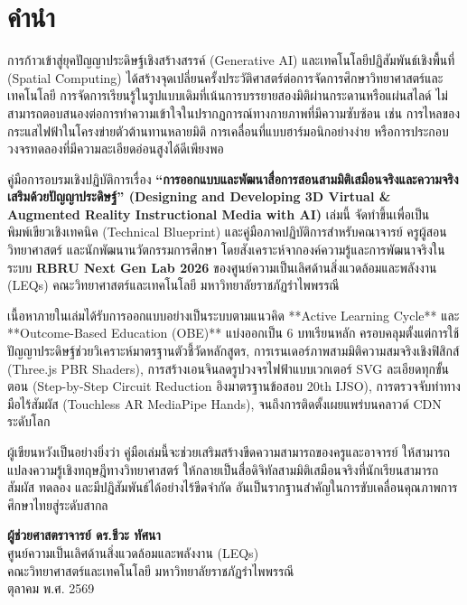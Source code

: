 \chapter*{คำนำ}

การก้าวเข้าสู่ยุคปัญญาประดิษฐ์เชิงสร้างสรรค์ (Generative AI) และเทคโนโลยีปฏิสัมพันธ์เชิงพื้นที่ (Spatial Computing) ได้สร้างจุดเปลี่ยนครั้งประวัติศาสตร์ต่อการจัดการศึกษาวิทยาศาสตร์และเทคโนโลยี การจัดการเรียนรู้ในรูปแบบเดิมที่เน้นการบรรยายสองมิติผ่านกระดานหรือแผ่นสไลด์ ไม่สามารถตอบสนองต่อการทำความเข้าใจในปรากฏการณ์ทางกายภาพที่มีความซับซ้อน เช่น การไหลของกระแสไฟฟ้าในโครงข่ายตัวต้านทานหลายมิติ การเคลื่อนที่แบบฮาร์มอนิกอย่างง่าย หรือการประกอบวงจรทดลองที่มีความละเอียดอ่อนสูงได้ดีเพียงพอ

คู่มือการอบรมเชิงปฏิบัติการเรื่อง \textbf{“การออกแบบและพัฒนาสื่อการสอนสามมิติเสมือนจริงและความจริงเสริมด้วยปัญญาประดิษฐ์” (Designing and Developing 3D Virtual \& Augmented Reality Instructional Media with AI)} เล่มนี้ จัดทำขึ้นเพื่อเป็นพิมพ์เขียวเชิงเทคนิค (Technical Blueprint) และคู่มือภาคปฏิบัติการสำหรับคณาจารย์ ครูผู้สอนวิทยาศาสตร์ และนักพัฒนานวัตกรรมการศึกษา โดยสังเคราะห์จากองค์ความรู้และการพัฒนาจริงในระบบ \textbf{RBRU Next Gen Lab 2026} ของศูนย์ความเป็นเลิศด้านสิ่งแวดล้อมและพลังงาน (LEQs) คณะวิทยาศาสตร์และเทคโนโลยี มหาวิทยาลัยราชภัฏรำไพพรรณี 

เนื้อหาภายในเล่มได้รับการออกแบบอย่างเป็นระบบตามแนวคิด **Active Learning Cycle** และ **Outcome-Based Education (OBE)** แบ่งออกเป็น 6 บทเรียนหลัก ครอบคลุมตั้งแต่การใช้ปัญญาประดิษฐ์ช่วยวิเคราะห์มาตรฐานตัวชี้วัดหลักสูตร, การเรนเดอร์ภาพสามมิติความสมจริงเชิงฟิสิกส์ (Three.js PBR Shaders), การสร้างเอนจินลดรูปวงจรไฟฟ้าแบบเวกเตอร์ SVG ละเอียดทุกขั้นตอน (Step-by-Step Circuit Reduction อิงมาตรฐานข้อสอบ 20th IJSO), การตรวจจับท่าทางมือไร้สัมผัส (Touchless AR MediaPipe Hands), จนถึงการติดตั้งเผยแพร่บนคลาวด์ CDN ระดับโลก

ผู้เขียนหวังเป็นอย่างยิ่งว่า คู่มือเล่มนี้จะช่วยเสริมสร้างขีดความสามารถของครูและอาจารย์ ให้สามารถแปลงความรู้เชิงทฤษฎีทางวิทยาศาสตร์ ให้กลายเป็นสื่อดิจิทัลสามมิติเสมือนจริงที่นักเรียนสามารถสัมผัส ทดลอง และมีปฏิสัมพันธ์ได้อย่างไร้ขีดจำกัด อันเป็นรากฐานสำคัญในการขับเคลื่อนคุณภาพการศึกษาไทยสู่ระดับสากล

\vspace{1.5cm}
\begin{flushright}
\textbf{ผู้ช่วยศาสตราจารย์ ดร.ชีวะ ทัศนา}\\
ศูนย์ความเป็นเลิศด้านสิ่งแวดล้อมและพลังงาน (LEQs)\\
คณะวิทยาศาสตร์และเทคโนโลยี มหาวิทยาลัยราชภัฏรำไพพรรณี\\
ตุลาคม พ.ศ. 2569
\end{flushright}

